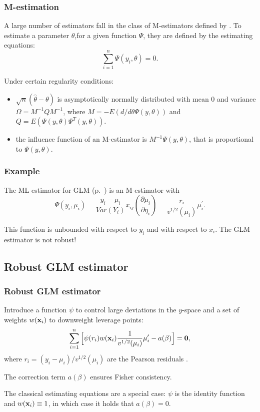 \documentclass{beamer}
\newcommand{\bs}{\bigskip}
\begin{document}
\begin{frame}
\frametitle{M-estimation}
A large number of estimators fall in the class of M-estimators defined by
. To estimate a parameter $\theta$,for a given function $\Psi$,  they are defined by the
estimating equations:
$$\sum_{i=1}^n \Psi(y_i,\theta) = 0.$$

Under certain regularity conditions:
\begin{itemize}
\item $\sqrt{n} (\hat{\theta} - \theta)$ is asymptotically normally distributed
with mean 0 and variance $\Omega = M^{-1} Q M^{-1}$, where $M=- E(d/ d \theta
\Psi(y,\theta))$ and $Q= E (\Psi(y,\theta) \Psi^T(y,\theta))$.
\item the influence function of an M-estimator is $M^{-1} \Psi(y,\theta)$, that is
proportional to $\Psi(y,\theta)$.
\end{itemize}

\end{frame}

\begin{frame}
\frametitle{Example}

The {\color{blue} ML estimator for GLM} (p.~\pageref{EE.GLM}) is
an M-estimator with 
$$\Psi(y_i,\mu_i) = \frac{y_i-\mu_i}{Var(Y_i)} x_{ij}
(\frac{\partial \mu_i}{\partial \eta_i}) = \frac{r_i}{v^{1/2}(\mu_i)} \mu_i^{\prime}.$$

\bs
This function is unbounded with respect to $y_i$ and with respect to $x_i$. The
GLM estimator is {\color{blue}not robust}!

\end{frame}

\subsection{Robust GLM estimator}
\begin{frame}
\frametitle{Robust GLM estimator}
Introduce a function $\psi$ to control 
large deviations in the $y$-space and a set of weights  $w({\bf x}_i)$ to
downweight leverage points:
\begin{equation*}
\label{EE.eq}
\sum_{i=1}^n \Big[ \psi(r_i ) w({\bf x}_i)
\frac{1}{v^{1/2}(\mu_i)}  \mu_i^{\prime}  - a(\beta) \Big] = {\bf 0},
\end{equation*}
where $r_i = (y_i-\mu_i)/v^{1/2}(\mu_i)$ are the Pearson residuals \cite{Cant:Ronc:2001a}.

\bs
The correction term $a(\beta)$ ensures Fisher consistency.

\bs
The classical estimating equations are a special case: $\psi$
is the identity function and $ w({\bf x}_i) \equiv 1$,
in which case it holds that $a(\beta) = 0$.
\end{frame}
\end{document}

